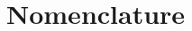 \documentclass[11pt,a4paper,openany,oneside,parskip=half*]{article}
\begin{document}
\makenomenclature %

\renewcommand{\refname}{}
\renewcommand{\nomname}{}



\setlength{\columnsep}{30pt}
\setlength{\parindent}{0pt}

\pagebreak

\tableofcontents{} %
 
\pagebreak

\section{Nomenclature}
\begin{multicols}{2}
\setlength{\columnseprule}{1pt}
\printnomenclature
\end{multicols}
\pagebreak
\end{document}
